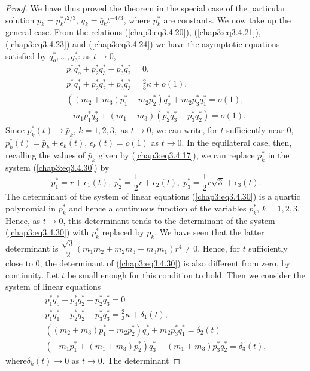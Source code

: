 \begin{proof}
We have thus proved the theorem in the special case of the particular
solution $p_k = p^*_k t^{2/3}$, $q_k = \bar{q}_k t^{-4/3}$, where
$p^*_k$ are constants. We now take up the general case. From the
relations (\ref{chap3:eq3.4.20}), (\ref{chap3:eq3.4.21}),
(\ref{chap3:eq3.4.23}) and (\ref{chap3:eq3.4.24}) we have the
asymptotic equations satisfied by $q^*_o, \ldots, q^*_3$: as $t \to
0$, 
\begin{gather*}
p^*_1 q^*_o + p^*_2 q^*_3 - p^*_3 q^*_2 = 0,\\
p^*_1 q^*_1 + p^*_2 q^*_2 + p^*_3 q^*_3 = \frac{2}{3} \kappa +
o(1),\\ 
((m_2 + m_3) p^*_1 - m_2 p^*_2) q^*_o + m_2 p^*_3 q^*_1 = o(1), \\ 
- m_1 p^*_1 q^*_3 + (m_1 + m_3) (p^*_2 q^*_3 - p^*_3 q^*_2) =
o(1). \tag{3.4.30}\label{chap3:eq3.4.30} 
\end{gather*}\pageoriginale
Since $p^*_k(t) \to \bar{p}_k$, $k = 1,2,3,$ as $t \to 0$, we can
write, for $t$ sufficiently near 0, $p^*_k (t)  = \bar{p}_k +
\epsilon_k(t)$, $\epsilon_k(t) = o(1)$ as $t \to 0$. In the
equilateral case, then, recalling the values of $\bar{p}_k$ given by
(\ref{chap3:eq3.4.17}), we can replace $p^*_k$ in the system
(\ref{chap3:eq3.4.30}) by 
$$
p^*_1 = r + \epsilon_1(t), \; p^*_2 = \frac{1}{2}  r + \epsilon_2 (t),
\; p^*_3 =\frac{1}{2} r \sqrt{3} + \epsilon_3(t). 
$$
The determinant of the system of linear equations
(\ref{chap3:eq3.4.30}) is a quartic polynomial in $p^*_k$ and hence a
continuous function of the variables $p^*_k$, $k=1,2,3$. Hence, as $t
\to 0$, this determinant tends to the determinant of the system
(\ref{chap3:eq3.4.30}) with $p^*_k$ replaced by $\bar{p}_k$. We have
seen that the latter determinant is $\dfrac{\sqrt{3}}{2} (m_1 m_2 +
m_2 m_3 + m_3 m_1) r^4 \neq 0 $. Hence, for $t$ sufficiently close to
0, the determinant of (\ref{chap3:eq3.4.30}) is also different from
zero, by continuity. Let $t$ be small enough for this condition to
hold. Then we consider the system of linear equations 
\begin{gather*}
p^*_1 q^*_o - p^*_3 q^*_2 + p^*_2 q^*_3 = 0\\
p^*_1 q^*_1 + p^*_2 q^*_2 + p^*_3 q^*_3 = \frac{2}{3} \kappa + \delta_1 (t),\\
((m_2 + m_3)p^*_1 - m_2 p^*_2) q^*_o + m_2 p^*_3 q^*_1 = \delta_2(t)\\
(-m_1 p^*_1 + (m_1+ m_3)p^*_2)q^*_3 - (m_1 + m_3) p^*_3 q^*_2 =
\delta_3 (t), \tag{3.4.31}\label{chap3:eq3.4.31} 
\end{gather*}
where\pageoriginale $\delta_k(t) \to 0$ as $t \to 0$. The determinant

\end{proof}
